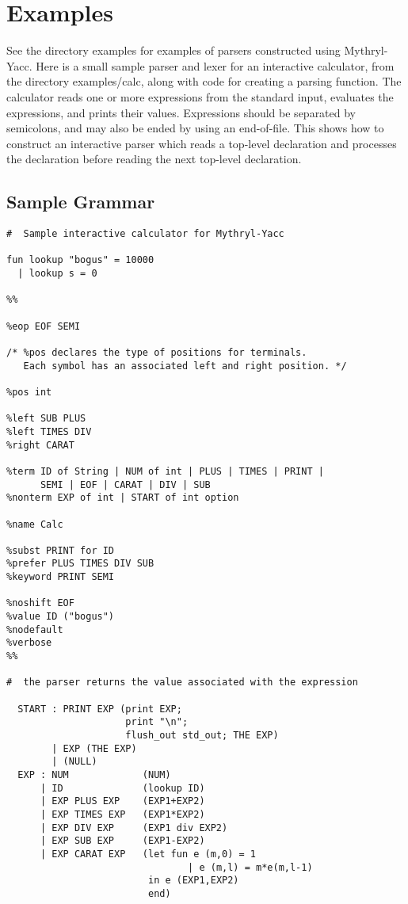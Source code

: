 \section{Examples}

See the directory examples for examples of parsers constructed using
Mythryl-Yacc.  Here is a small sample parser and lexer for an interactive
calculator, from the directory examples/calc, along with code for
creating a parsing function.  The calculator reads one or more
expressions from the standard input, evaluates the expressions, and
prints their values.  Expressions should be separated by semicolons,
and may also be ended by using an end-of-file.  This shows how to
construct an interactive parser which reads a top-level declaration
and processes the declaration before reading the next top-level
declaration.

\subsection{Sample Grammar}
\begin{tt}
\begin{verbatim}
#  Sample interactive calculator for Mythryl-Yacc 

fun lookup "bogus" = 10000
  | lookup s = 0

%%

%eop EOF SEMI

/* %pos declares the type of positions for terminals.
   Each symbol has an associated left and right position. */

%pos int

%left SUB PLUS
%left TIMES DIV
%right CARAT

%term ID of String | NUM of int | PLUS | TIMES | PRINT |
      SEMI | EOF | CARAT | DIV | SUB
%nonterm EXP of int | START of int option

%name Calc

%subst PRINT for ID
%prefer PLUS TIMES DIV SUB
%keyword PRINT SEMI

%noshift EOF
%value ID ("bogus")
%nodefault
%verbose
%%

#  the parser returns the value associated with the expression 

  START : PRINT EXP (print EXP;
                     print "\n";
                     flush_out std_out; THE EXP)
        | EXP (THE EXP)
        | (NULL)
  EXP : NUM             (NUM)
      | ID              (lookup ID)
      | EXP PLUS EXP    (EXP1+EXP2)
      | EXP TIMES EXP   (EXP1*EXP2)
      | EXP DIV EXP     (EXP1 div EXP2)
      | EXP SUB EXP     (EXP1-EXP2)
      | EXP CARAT EXP   (let fun e (m,0) = 1
                                | e (m,l) = m*e(m,l-1)
                         in e (EXP1,EXP2)       
                         end)
\end{verbatim}
\end{tt}
